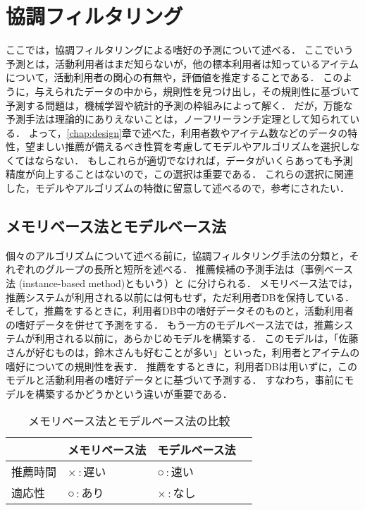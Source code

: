 \chapter{協調フィルタリング}
\label{chap:cf}

ここでは，協調フィルタリングによる嗜好の予測について述べる．
ここでいう予測とは，活動利用者はまだ知らないが，他の標本利用者は知っているアイテムについて，活動利用者の関心の有無や，評価値を推定することである．
このように，与えられたデータの中から，規則性を見つけ出し，その規則性に基づいて予測する問題は，機械学習や統計的予測の枠組みによって解く．
だが，万能な予測手法は理論的にありえないことは，ノーフリーランチ定理として知られている．
よって，\ref{chap:design}章で述べた，利用者数やアイテム数などのデータの特性，望ましい推薦が備えるべき性質を考慮してモデルやアルゴリズムを選択しなくてはならない．
もしこれらが適切でなければ，データがいくらあっても予測精度が向上することはないので，この選択は重要である．
これらの選択に関連した，モデルやアルゴリズムの特徴に留意して述べるので，参考にされたい．

\section{メモリベース法とモデルベース法}
\label{sec:memory-model}

個々のアルゴリズムについて述べる前に，協調フィルタリング手法の分類と，それぞれのグループの長所と短所を述べる．
推薦候補の予測手法は（事例ベース法 (instance-based method)ともいう）と
 に分けられる\cite{uai:98:01}．
メモリベース法では，推薦システムが利用される以前には何もせず，ただ利用者DBを保持している．
そして，推薦をするときに，利用者DB中の嗜好データそのものと，活動利用者の嗜好データを併せて予測をする．
もう一方のモデルベース法では，推薦システムが利用される以前に，あらかじめモデルを構築する．
このモデルは，「佐藤さんが好むものは，鈴木さんも好むことが多い」といった，利用者とアイテムの嗜好についての規則性を表す．
推薦をするときに，利用者DBは用いずに，このモデルと活動利用者の嗜好データとに基づいて予測する．
すなわち，事前にモデルを構築するかどうかという違いが重要である．

\begin{table}
\centering
\caption{メモリベース法とモデルベース法の比較}
\label{tab:memory-model}
\begin{tabular}{l@{\qquad}>{\centering}p{}>{\centering}p{}p{0pt}}\toprule
 & メモリベース法 & モデルベース法 & \\\midrule
推薦時間 & ×\,:\,遅い & ○\,:\,速い & \\
適応性   & ○\,:\,あり & ×\,:\,なし & \\
\bottomrule
\end{tabular}
\end{table}

